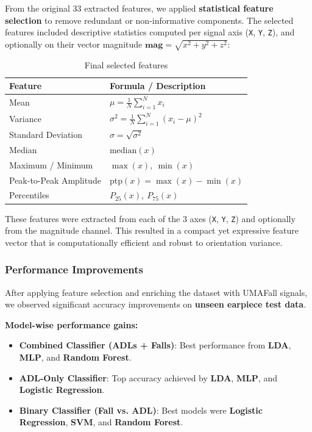 \documentclass[conference]{IEEEtran}
\begin{document}
From the original 33 extracted features, we applied \textbf{statistical feature selection} to remove redundant or non-informative components. The selected features included descriptive statistics computed per signal axis (\texttt{X}, \texttt{Y}, \texttt{Z}), and optionally on their vector magnitude $\mathbf{mag} = \sqrt{x^2 + y^2 + z^2}$:

\begin{table}[htbp]
\centering
\caption{Final selected features}
\label{tab:stat-features}
\renewcommand{\arraystretch}{1.3}
\small
\begin{tabular}{|l|l|}
\hline
\textbf{Feature} & \textbf{Formula / Description} \\
\hline
Mean & $\mu = \frac{1}{N} \sum_{i=1}^{N} x_i$ \\
\hline
Variance & $\sigma^2 = \frac{1}{N} \sum_{i=1}^{N} (x_i - \mu)^2$ \\
\hline
Standard Deviation & $\sigma = \sqrt{\sigma^2}$ \\
\hline
Median & $\text{median}(x)$ \\
\hline
Maximum / Minimum & $\max(x),\ \min(x)$ \\
\hline
Peak-to-Peak Amplitude & $\text{ptp}(x) = \max(x) - \min(x)$ \\
\hline
Percentiles & $P_{25}(x),\ P_{75}(x)$ \\
\hline
\end{tabular}
\end{table}


These features were extracted from each of the 3 axes (\texttt{X}, \texttt{Y}, \texttt{Z}) and optionally from the magnitude channel. This resulted in a compact yet expressive feature vector that is computationally efficient and robust to orientation variance.


\subsubsection{Performance Improvements}

After applying feature selection and enriching the dataset with UMAFall signals, we observed significant accuracy improvements on \textbf{unseen earpiece test data}.

\textbf{Model-wise performance gains:}
\begin{itemize}
    \item \textbf{Combined Classifier (ADLs + Falls)}: Best performance from \textbf{LDA}, \textbf{MLP}, and \textbf{Random Forest}.
    \item \textbf{ADL-Only Classifier}: Top accuracy achieved by \textbf{LDA}, \textbf{MLP}, and \textbf{Logistic Regression}.
    \item \textbf{Binary Classifier (Fall vs. ADL)}: Best models were \textbf{Logistic Regression}, \textbf{SVM}, and \textbf{Random Forest}.
\end{itemize}
\end{document}
